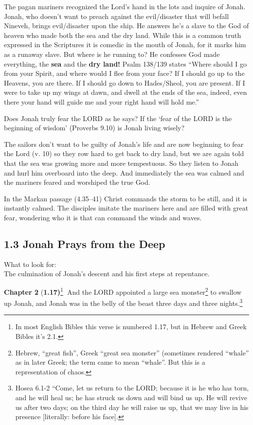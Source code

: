 \documentclass[
]{article}
\begin{document}
The pagan mariners recognized the Lord's hand in the lots and inquire of
Jonah. Jonah, who doesn't want to preach against the evil/disaster that
will befall Nineveh, brings evil/disaster upon the ship. He answers he's
a slave to the God of heaven who made both the sea and the dry land.
While this is a common truth expressed in the Scriptures it is comedic
in the mouth of Jonah, for it marks him as a runaway slave. But where is
he running to? He confesses God made everything, the \textbf{sea} and
the \textbf{dry land!} Psalm 138/139 states ``Where should I go from
your Spirit, and where would I flee from your face? If I should go up to
the Heavens, you are there. If I should go down to Hades/Sheol, you are
present. If I were to take up my wings at dawn, and dwell at the ends of
the sea, indeed, even there your hand will guide me and your right hand
will hold me.''

Does Jonah truly fear the LORD as he says? If the `fear of the LORD is
the beginning of wisdom' (Proverbs 9.10) is Jonah living wisely?

The sailors don't want to be guilty of Jonah's life and are now
beginning to fear the Lord (v. 10) so they row hard to get back to dry
land, but we are again told that the sea was growing more and more
tempestuous. So they listen to Jonah and hurl him overboard into the
deep. And immediately the sea was calmed and the mariners feared and
worshiped the true God.

In the Markan passage (4.35--41) Christ commands the storm to be still,
and it is instantly calmed. The disciples imitate the mariners here and
are filled with great fear, wondering who it is that can command the
winds and waves.

\subsection{1.3 Jonah Prays from the
Deep}\label{jonah-prays-from-the-deep}

What to look for:\\
The culmination of Jonah's descent and his first steps at repentance.

\textbf{Chapter 2} (\textbf{1.17)}\footnote{In most English Bibles this
  verse is numbered 1.17, but in Hebrew and Greek Bibles it's 2.1.}\textbf{~}And
the LORD appointed a large sea monster\footnote{Hebrew, ``great fish'',
  Greek ``great sea monster'' (sometimes rendered ``whale'' as in later
  Greek; the term came to mean ``whale''. But this is a representation
  of chaos.} to swallow up Jonah, and Jonah was in the belly of the
beast three days and three nights.\footnote{Hosea 6.1-2 ``Come, let us
  return to the LORD; because it is he who has torn, and he will heal
  us; he has struck us down and will bind us up. He will revive us after
  two days; on the third day he will raise us up, that we may live in
  his presence {[}literally: before his face{]}.}\textbf{~}
\end{document}
